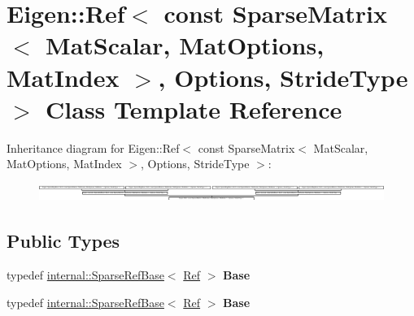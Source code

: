 \hypertarget{class_eigen_1_1_ref_3_01const_01_sparse_matrix_3_01_mat_scalar_00_01_mat_options_00_01_mat_index1bbfd78857ba9c14d54178cb3009ac38}{}\section{Eigen\+:\+:Ref$<$ const Sparse\+Matrix$<$ Mat\+Scalar, Mat\+Options, Mat\+Index $>$, Options, Stride\+Type $>$ Class Template Reference}
\label{class_eigen_1_1_ref_3_01const_01_sparse_matrix_3_01_mat_scalar_00_01_mat_options_00_01_mat_index1bbfd78857ba9c14d54178cb3009ac38}
Inheritance diagram for Eigen\+:\+:Ref$<$ const Sparse\+Matrix$<$ Mat\+Scalar, Mat\+Options, Mat\+Index $>$, Options, Stride\+Type $>$\+:\begin{figure}[H]
\begin{center}
\leavevmode
\includegraphics[height=0.594059cm]{class_eigen_1_1_ref_3_01const_01_sparse_matrix_3_01_mat_scalar_00_01_mat_options_00_01_mat_index1bbfd78857ba9c14d54178cb3009ac38}
\end{center}
\end{figure}
\subsection*{Public Types}
\begin{DoxyCompactItemize}
\item 
\mbox{\label{class_eigen_1_1_ref_3_01const_01_sparse_matrix_3_01_mat_scalar_00_01_mat_options_00_01_mat_index1bbfd78857ba9c14d54178cb3009ac38_a8a8f6c044d88e4d3bb0055c282ecf76e}} 
typedef \hyperlink{class_eigen_1_1internal_1_1_sparse_ref_base}{internal\+::\+Sparse\+Ref\+Base}$<$ \hyperlink{group___core___module_class_eigen_1_1_ref}{Ref} $>$ {\bfseries Base}
\item 
\mbox{\label{class_eigen_1_1_ref_3_01const_01_sparse_matrix_3_01_mat_scalar_00_01_mat_options_00_01_mat_index1bbfd78857ba9c14d54178cb3009ac38_a8a8f6c044d88e4d3bb0055c282ecf76e}} 
typedef \hyperlink{class_eigen_1_1internal_1_1_sparse_ref_base}{internal\+::\+Sparse\+Ref\+Base}$<$ \hyperlink{group___core___module_class_eigen_1_1_ref}{Ref} $>$ {\bfseries Base}
\end{DoxyCompactItemize}
